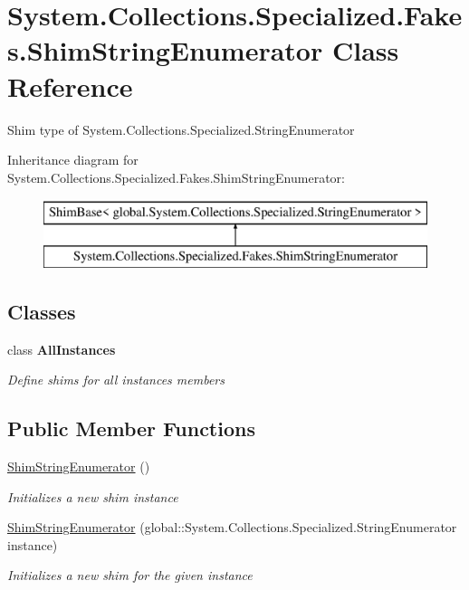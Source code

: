 \hypertarget{class_system_1_1_collections_1_1_specialized_1_1_fakes_1_1_shim_string_enumerator}{\section{System.\-Collections.\-Specialized.\-Fakes.\-Shim\-String\-Enumerator Class Reference}
\label{class_system_1_1_collections_1_1_specialized_1_1_fakes_1_1_shim_string_enumerator}
}


Shim type of System.\-Collections.\-Specialized.\-String\-Enumerator 


Inheritance diagram for System.\-Collections.\-Specialized.\-Fakes.\-Shim\-String\-Enumerator\-:\begin{figure}[H]
\begin{center}
\leavevmode
\includegraphics[height=2.000000cm]{class_system_1_1_collections_1_1_specialized_1_1_fakes_1_1_shim_string_enumerator}
\end{center}
\end{figure}
\subsection*{Classes}
\begin{DoxyCompactItemize}
\item 
class {\bfseries All\-Instances}
\begin{DoxyCompactList}\small\item\em Define shims for all instances members\end{DoxyCompactList}\end{DoxyCompactItemize}
\subsection*{Public Member Functions}
\begin{DoxyCompactItemize}
\item 
\hyperlink{class_system_1_1_collections_1_1_specialized_1_1_fakes_1_1_shim_string_enumerator_a8f2e99c899c2b6c2486836e6245d27a5}{Shim\-String\-Enumerator} ()
\begin{DoxyCompactList}\small\item\em Initializes a new shim instance\end{DoxyCompactList}\item 
\hyperlink{class_system_1_1_collections_1_1_specialized_1_1_fakes_1_1_shim_string_enumerator_aa391ab714d2c0b1d206d4a718731c30d}{Shim\-String\-Enumerator} (global\-::\-System.\-Collections.\-Specialized.\-String\-Enumerator instance)
\begin{DoxyCompactList}\small\item\em Initializes a new shim for the given instance\end{DoxyCompactList}\end{DoxyCompactItemize}
